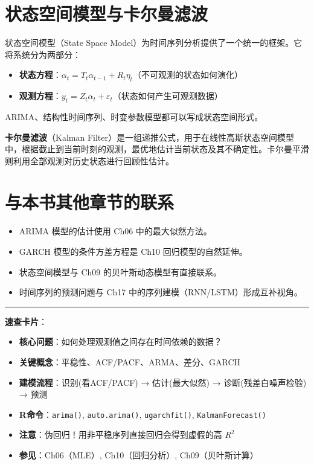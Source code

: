 \documentclass[
]{book}
\providecommand{\tightlist}{%
  \setlength{\itemsep}{0pt}\setlength{\parskip}{0pt}}
\begin{document}
\section{状态空间模型与卡尔曼滤波}\label{ux72b6ux6001ux7a7aux95f4ux6a21ux578bux4e0eux5361ux5c14ux66fcux6ee4ux6ce2}

状态空间模型（State Space Model）为时间序列分析提供了一个统一的框架。它将系统分为两部分：

\begin{itemize}
\tightlist
\item
  \textbf{状态方程}：\(\alpha_t = T_t \alpha_{t-1} + R_t \eta_t\)（不可观测的状态如何演化）
\item
  \textbf{观测方程}：\(y_t = Z_t \alpha_t + \varepsilon_t\)（状态如何产生可观测数据）
\end{itemize}

ARIMA、结构性时间序列、时变参数模型都可以写成状态空间形式。

\textbf{卡尔曼滤波}（Kalman Filter）是一组递推公式，用于在线性高斯状态空间模型中，根据截止到当前时刻的观测，最优地估计当前状态及其不确定性。卡尔曼平滑则利用全部观测对历史状态进行回顾性估计。

\section{与本书其他章节的联系}\label{ux4e0eux672cux4e66ux5176ux4ed6ux7ae0ux8282ux7684ux8054ux7cfb}

\begin{itemize}
\tightlist
\item
  ARIMA 模型的估计使用 Ch06 中的最大似然方法。
\item
  GARCH 模型的条件方差方程是 Ch10 回归模型的自然延伸。
\item
  状态空间模型与 Ch09 的贝叶斯动态模型有直接联系。
\item
  时间序列的预测问题与 Ch17 中的序列建模（RNN/LSTM）形成互补视角。
\end{itemize}

\begin{center}\rule{0.5\linewidth}{0.5pt}\end{center}

\textbf{速查卡片}：

\begin{itemize}
\tightlist
\item
  \textbf{核心问题}：如何处理观测值之间存在时间依赖的数据？
\item
  \textbf{关键概念}：平稳性、ACF/PACF、ARMA、差分、GARCH
\item
  \textbf{建模流程}：识别(看ACF/PACF) → 估计(最大似然) → 诊断(残差白噪声检验) → 预测
\item
  \textbf{R命令}：\texttt{arima()}, \texttt{auto.arima()}, \texttt{ugarchfit()}, \texttt{KalmanForecast()}
\item
  \textbf{注意}：伪回归！用非平稳序列直接回归会得到虚假的高 \(R^2\)
\item
  \textbf{参见}：Ch06（MLE）, Ch10（回归分析）, Ch09（贝叶斯计算）
\end{itemize}
\end{document}
